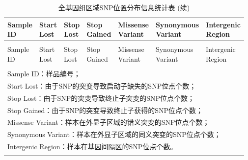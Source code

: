 \documentclass[
  a4paper,
  titlepage]{article}
\begin{document}
\begin{longtable}[t]{lllllll}
\caption{\label{tab:snpannostat-table}全基因组区域SNP位置分布信息统计表}\\
\toprule
\makecell[c]{Sample\\ID} & \makecell[c]{Start\\Lost} & \makecell[c]{Stop\\Lost} & \makecell[c]{Stop\\Gained} & \makecell[c]{Missense\\Variant} & \makecell[c]{Synonymous\\Variant} & \makecell[c]{Intergenic\\Region}\\
\midrule
\endfirsthead
\caption[]{\label{tab:snpannostat-table}全基因组区域SNP位置分布信息统计表 (续)}\\
\toprule
\makecell[c]{Sample\\ID} & \makecell[c]{Start\\Lost} & \makecell[c]{Stop\\Lost} & \makecell[c]{Stop\\Gained} & \makecell[c]{Missense\\Variant} & \makecell[c]{Synonymous\\Variant} & \makecell[c]{Intergenic\\Region}\\
\midrule
\endhead
\hline
\endfoot
\bottomrule
\multicolumn{7}{l}{\rule{0pt}{1em}\textit{注：}}\\
\multicolumn{7}{l}{\rule{0pt}{1em}Sample ID：样品编号；}\\
\multicolumn{7}{l}{\rule{0pt}{1em}Start Lost：由于SNP的突变导致启动子缺失的SNP位点个数；}\\
\multicolumn{7}{l}{\rule{0pt}{1em}Stop Lost：由于SNP的突变导致终止子突变的SNP位点个数；}\\
\multicolumn{7}{l}{\rule{0pt}{1em}Stop Gained：由于SNP的突变导致终止子获得的SNP位点个数；}\\
\multicolumn{7}{l}{\rule{0pt}{1em}Missense Variant：样本在外显子区域的错义突变的SNP位点个数；}\\
\multicolumn{7}{l}{\rule{0pt}{1em}Synonymous Variant：样本在外显子区域的同义突变的SNP位点个数；}\\
\multicolumn{7}{l}{\rule{0pt}{1em}Intergenic Region：样本在基因间隔区的SNP位点个数。}\\
\endlastfoot
\cellcolor{gray!6}{FJMS} & \cellcolor{gray!6}{268} & \cellcolor{gray!6}{464} & \cellcolor{gray!6}{3,275} & \cellcolor{gray!6}{119,411} & \cellcolor{gray!6}{79,928} & \cellcolor{gray!6}{2,288,257}\\
 

\end{longtable}
\end{document}
